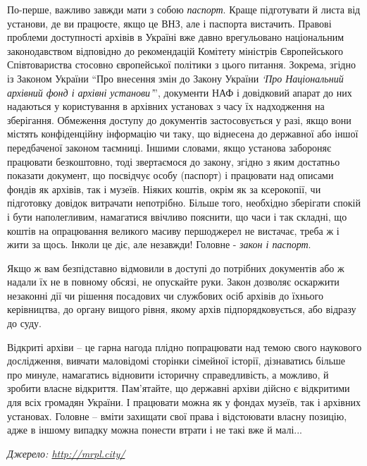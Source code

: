 По-перше, важливо завжди мати з собою \emph{паспорт}. Краще підготувати й листа від
установи, де ви працюєте, якщо це ВНЗ, але і паспорта вистачить. Правові
проблеми доступності архівів в Україні вже давно врегульовано національним
законодавством відповідно до рекомендацій Комітету міністрів Європейського
Співтовариства стосовно європейської політики з цього питання. Зокрема, згідно
із Законом України \enquote{Про внесення змін до Закону України \emph{\enquote{Про
Національний архівний фонд і архівні установи}}}, документи НАФ і довідковий
апарат до них надаються у користування в архівних установах з часу їх
надходження на зберігання. Обмеження доступу до документів застосовується у
разі, якщо вони містять конфіденційну інформацію чи таку, що віднесена до
державної або іншої передбаченої законом таємниці. Іншими словами, якщо
установа забороняє працювати безкоштовно, тоді звертаємося до закону, згідно з
яким достатньо показати документ, що посвідчує особу (паспорт) і працювати над
описами фондів як архівів, так і музеїв. Ніяких коштів, окрім як за ксерокопії,
чи підготовку довідок витрачати непотрібно. Більше того, необхідно зберігати
спокій і бути наполегливим, намагатися ввічливо пояснити, що часи і так
складні, що коштів на опрацювання великого масиву першоджерел не вистачає,
треба ж і жити за щось.  Інколи це діє, але незавжди! Головне - \emph{закон і
паспорт}. 

Якщо ж вам безпідставно відмовили в доступі до потрібних документів або ж
надали їх не в повному обсязі, не опускайте руки. Закон дозволяє оскаржити
незаконні дії чи рішення посадових чи службових осіб архівів до їхнього
керівництва, до органу вищого рівня, якому архів підпорядковується, або відразу
до суду.

Відкриті архіви – це гарна нагода плідно попрацювати над темою свого наукового
дослідження, вивчати маловідомі сторінки сімейної історії, дізнаватись більше
про минуле, намагатись відновити історичну справедливість, а можливо, й зробити
власне відкриття. Пам'ятайте, що державні архіви дійсно є відкритими для всіх
громадян України. І працювати можна як у фондах музеїв, так і архівних
установах. Головне – вміти захищати свої права і відстоювати власну позицію,
адже в іншому випадку можна понести втрати і не такі вже й малі... 

\emph{Джерело: \url{http://mrpl.city/}}


